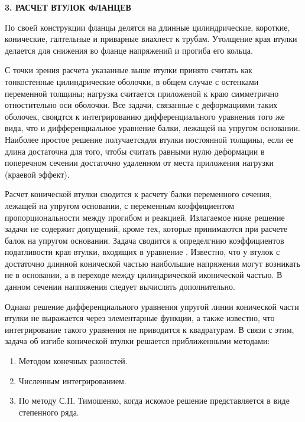 \newpage
\begin{center}
  \textbf{\large 3. РАСЧЕТ ВТУЛОК ФЛАНЦЕВ}
\end{center}


По своей конструкции фланцы делятся на длинные цилиндрические, короткие, конические, галтельные и приварные внахлест к трубам.
Утолщение края втулки делается для снижения во фланце напряжений и прогиба его кольца.

С точки зрения расчета указанные выше втулки принято считать как тонкостенные цилиндрические оболочки, в общем случае с остенками переменной толщины; нагрузка считается приложеной к краю симметрично отностительно оси оболочки.
Все задачи, связанные с деформациями таких оболочек, своядтся к интегрированию дифференциального уравнения того же вида, что и дифференциальное уравнение балки, лежащей на упругом основании. 
Наиболее простое решение получаетсядля втулки постоянной толщины, если ее длина достаточна для того, чтобы считать равными нулю деформации в поперечном сечении достаточно удаленном от места приложения нагрузки (краевой эффект). 

Расчет конической втулки сводится к расчету балки переменного сечения, лежащей на упругом основании, с переменным коэффициентом пропорциональности между прогибом и реакцией.
Излагаемое ниже решение задачи не содержит допущений, кроме тех, которые принимаются при расчете балок на упругом основании.
Задача сводится к определгнию коэффициентов податливости края втулки, входящих в уравнение . 
Известно, что у втулок с достаточно длинной конической частью наибольшие напряжения могут возникать не в основании, а в переходе между цилиндрической иконической частью. 
В данном сечении наппяжения следует вычислять дополнительно.

Однако решение дифференциального уравнения упругой линии конической части втулки не выражается через элементарные функции, а также известно, что интегрирование такого уравнения не приводится к квадратурам.
В связи с этим, задача об изгибе конической втулки решается приближенными методами:
\begin{enumerate}
  \item Методом конечных разностей.
  \item Численным интегрированием.
  \item По методу С.П. Тимошенко, когда искомое решение представляется в виде степенного ряда.
\end{enumerate}


